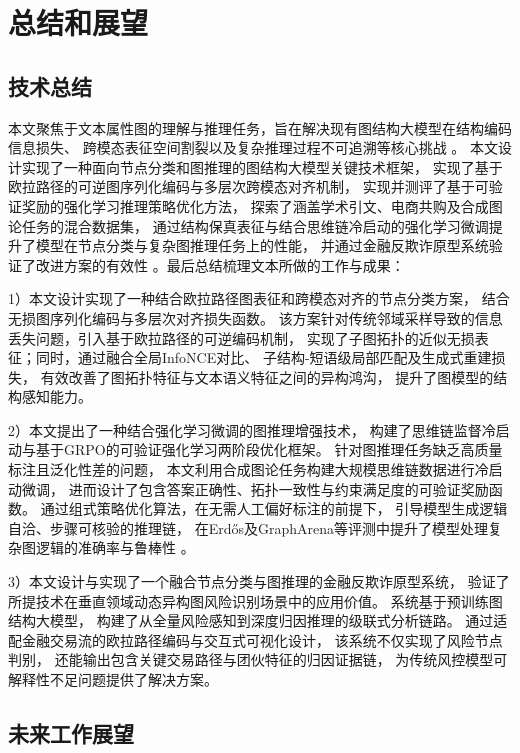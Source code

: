 
\chapter{总结和展望}

\section{技术总结}

本文聚焦于文本属性图的理解与推理任务，旨在解决现有图结构大模型在结构编码信息损失、
跨模态表征空间割裂以及复杂推理过程不可追溯等核心挑战 。
本文设计实现了一种面向节点分类和图推理的图结构大模型关键技术框架，
实现了基于欧拉路径的可逆图序列化编码与多层次跨模态对齐机制，
实现并测评了基于可验证奖励的强化学习推理策略优化方法，
探索了涵盖学术引文、电商共购及合成图论任务的混合数据集，
通过结构保真表征与结合思维链冷启动的强化学习微调提升了模型在节点分类与复杂图推理任务上的性能，
并通过金融反欺诈原型系统验证了改进方案的有效性 。最后总结梳理文本所做的工作与成果：

1）本文设计实现了一种结合欧拉路径图表征和跨模态对齐的节点分类方案，
结合无损图序列化编码与多层次对齐损失函数。
该方案针对传统邻域采样导致的信息丢失问题，引入基于欧拉路径的可逆编码机制，
实现了子图拓扑的近似无损表征；同时，通过融合全局InfoNCE对比、
子结构-短语级局部匹配及生成式重建损失，
有效改善了图拓扑特征与文本语义特征之间的异构鸿沟，
提升了图模型的结构感知能力。

2）本文提出了一种结合强化学习微调的图推理增强技术，
构建了思维链监督冷启动与基于GRPO的可验证强化学习两阶段优化框架。
针对图推理任务缺乏高质量标注且泛化性差的问题，
本文利用合成图论任务构建大规模思维链数据进行冷启动微调，
进而设计了包含答案正确性、拓扑一致性与约束满足度的可验证奖励函数。
通过组式策略优化算法，在无需人工偏好标注的前提下，
引导模型生成逻辑自洽、步骤可核验的推理链，
在Erdős及GraphArena等评测中提升了模型处理复杂图逻辑的准确率与鲁棒性 。


3）本文设计与实现了一个融合节点分类与图推理的金融反欺诈原型系统，
验证了所提技术在垂直领域动态异构图风险识别场景中的应用价值。
系统基于预训练图结构大模型，
构建了从全量风险感知到深度归因推理的级联式分析链路。
通过适配金融交易流的欧拉路径编码与交互式可视化设计，
该系统不仅实现了风险节点判别，
还能输出包含关键交易路径与团伙特征的归因证据链，
为传统风控模型可解释性不足问题提供了解决方案。

\section{未来工作展望}

